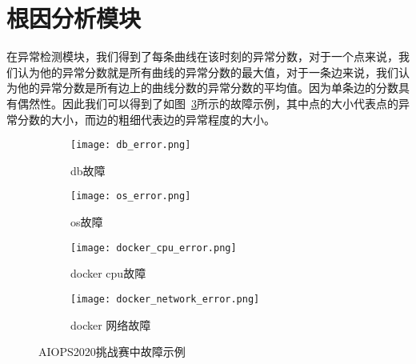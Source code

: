 \section{根因分析模块}
在异常检测模块，我们得到了每条曲线在该时刻的异常分数，对于一个点来说，我们认为他的异常分数就是所有曲线的异常分数的最大值，对于一条边来说，我们认为他的异常分数是所有边上的曲线分数的异常分数的平均值。因为单条边的分数具有偶然性。因此我们可以得到了如图~\ref{fig:error:example}所示的故障示例，其中点的大小代表点的异常分数的大小，而边的粗细代表边的异常程度的大小。
\begin{figure}[htbp]
  \centering
  \begin{subfigure}[b]{\textwidth}
    \begin{minipage}[t]{0.5\linewidth}
      \centering
      \texttt{[image: db\_error.png]}
      \caption{db故障}
      \label{fig:error:db}
    \end{minipage}
    \begin{minipage}[t]{0.5\linewidth}
      \centering
      \texttt{[image: os\_error.png]}
      \caption{os故障}
      \label{fig:error:os}
    \end{minipage}
  \end{subfigure}

  \begin{subfigure}[b]{\textwidth}
    \begin{minipage}[t]{0.5\linewidth}
      \centering
      \texttt{[image: docker\_cpu\_error.png]}
      \caption{docker cpu故障}
      \label{fig:error:db}
    \end{minipage}
    \begin{minipage}[t]{0.5\linewidth}
      \centering
      \texttt{[image: docker\_network\_error.png]}
      \caption{docker 网络故障}
      \label{fig:error:os}
    \end{minipage}
  \end{subfigure}
  \caption{AIOPS2020挑战赛中故障示例}
  \label{fig:error:example}
\end{figure}
